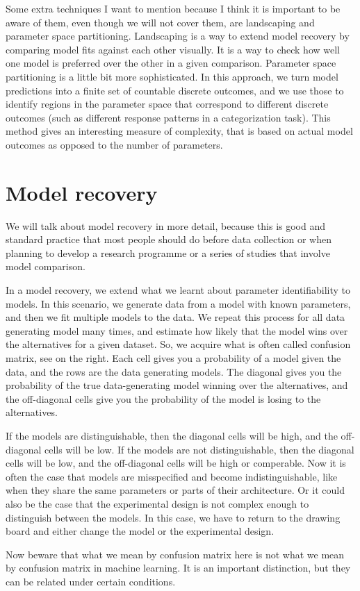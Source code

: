 \documentclass[12pt]{article}
\begin{document}
Some extra techniques I want to mention because I think it is important to be aware of them, even though we will not cover them, are landscaping and parameter space partitioning. Landscaping is a way to extend model recovery by comparing model fits against each other visually. It is a way to check how well one model is preferred over the other in a given comparison. Parameter space partitioning is a little bit more sophisticated. In this approach, we turn model predictions into a finite set of countable discrete outcomes, and we use those to identify regions in the parameter space that correspond to different discrete outcomes (such as different response patterns in a categorization task). This method gives an interesting measure of complexity, that is based on actual model outcomes as opposed to the number of parameters.

\section{Model recovery}

We will talk about model recovery in more detail, because this is good and standard practice that most people should do before data collection or when planning to develop a research programme or a series of studies that involve model comparison.

In a model recovery, we extend what we learnt about parameter identifiability to models. In this scenario, we generate data from a model with known parameters, and then we fit multiple models to the data. We repeat this process for all data generating model many times, and estimate how likely that the model wins over the alternatives for a given dataset. So, we acquire what is often called confusion matrix, see on the right. Each cell gives you a probability of a model given the data, and the rows are the data generating models. The diagonal gives you the probability of the true data-generating model winning over the alternatives, and the off-diagonal cells give you the probability of the model is losing to the alternatives.

If the models are distinguishable, then the diagonal cells will be high, and the off-diagonal cells will be low. If the models are not distinguishable, then the diagonal cells will be low, and the off-diagonal cells will be high or comperable. Now it is often the case that models are misspecified and become indistinguishable, like when they share the same parameters or parts of their architecture. Or it could also be the case that the experimental design is not complex enough to distinguish between the models. In this case, we have to return to the drawing board and either change the model or the experimental design.

Now beware that what we mean by confusion matrix here is not what we mean by confusion matrix in machine learning. It is an important distinction, but they can be related under certain conditions.
\end{document}
